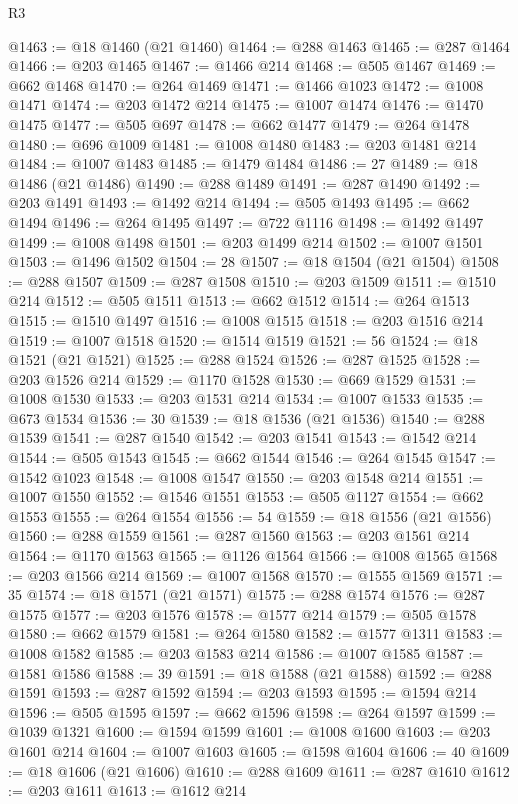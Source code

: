 \begin{lexlean}{R3}
\begin{coremodule}
@1463 := @18 @1460 (@21 @1460)
@1464 := @288 @1463
@1465 := @287 @1464
@1466 := @203 @1465
@1467 := @1466 @214
@1468 := @505 @1467
@1469 := @662 @1468
@1470 := @264 @1469
@1471 := @1466 @1023
@1472 := @1008 @1471
@1474 := @203 @1472 @214
@1475 := @1007 @1474
@1476 := @1470 @1475
@1477 := @505 @697
@1478 := @662 @1477
@1479 := @264 @1478
@1480 := @696 @1009
@1481 := @1008 @1480
@1483 := @203 @1481 @214
@1484 := @1007 @1483
@1485 := @1479 @1484
@1486 := 27
@1489 := @18 @1486 (@21 @1486)
@1490 := @288 @1489
@1491 := @287 @1490
@1492 := @203 @1491
@1493 := @1492 @214
@1494 := @505 @1493
@1495 := @662 @1494
@1496 := @264 @1495
@1497 := @722 @1116
@1498 := @1492 @1497
@1499 := @1008 @1498
@1501 := @203 @1499 @214
@1502 := @1007 @1501
@1503 := @1496 @1502
@1504 := 28
@1507 := @18 @1504 (@21 @1504)
@1508 := @288 @1507
@1509 := @287 @1508
@1510 := @203 @1509
@1511 := @1510 @214
@1512 := @505 @1511
@1513 := @662 @1512
@1514 := @264 @1513
@1515 := @1510 @1497
@1516 := @1008 @1515
@1518 := @203 @1516 @214
@1519 := @1007 @1518
@1520 := @1514 @1519
@1521 := 56
@1524 := @18 @1521 (@21 @1521)
@1525 := @288 @1524
@1526 := @287 @1525
@1528 := @203 @1526 @214
@1529 := @1170 @1528
@1530 := @669 @1529
@1531 := @1008 @1530
@1533 := @203 @1531 @214
@1534 := @1007 @1533
@1535 := @673 @1534
@1536 := 30
@1539 := @18 @1536 (@21 @1536)
@1540 := @288 @1539
@1541 := @287 @1540
@1542 := @203 @1541
@1543 := @1542 @214
@1544 := @505 @1543
@1545 := @662 @1544
@1546 := @264 @1545
@1547 := @1542 @1023
@1548 := @1008 @1547
@1550 := @203 @1548 @214
@1551 := @1007 @1550
@1552 := @1546 @1551
@1553 := @505 @1127
@1554 := @662 @1553
@1555 := @264 @1554
@1556 := 54
@1559 := @18 @1556 (@21 @1556)
@1560 := @288 @1559
@1561 := @287 @1560
@1563 := @203 @1561 @214
@1564 := @1170 @1563
@1565 := @1126 @1564
@1566 := @1008 @1565
@1568 := @203 @1566 @214
@1569 := @1007 @1568
@1570 := @1555 @1569
@1571 := 35
@1574 := @18 @1571 (@21 @1571)
@1575 := @288 @1574
@1576 := @287 @1575
@1577 := @203 @1576
@1578 := @1577 @214
@1579 := @505 @1578
@1580 := @662 @1579
@1581 := @264 @1580
@1582 := @1577 @1311
@1583 := @1008 @1582
@1585 := @203 @1583 @214
@1586 := @1007 @1585
@1587 := @1581 @1586
@1588 := 39
@1591 := @18 @1588 (@21 @1588)
@1592 := @288 @1591
@1593 := @287 @1592
@1594 := @203 @1593
@1595 := @1594 @214
@1596 := @505 @1595
@1597 := @662 @1596
@1598 := @264 @1597
@1599 := @1039 @1321
@1600 := @1594 @1599
@1601 := @1008 @1600
@1603 := @203 @1601 @214
@1604 := @1007 @1603
@1605 := @1598 @1604
@1606 := 40
@1609 := @18 @1606 (@21 @1606)
@1610 := @288 @1609
@1611 := @287 @1610
@1612 := @203 @1611
@1613 := @1612 @214

\end{coremodule}
\end{lexlean}
